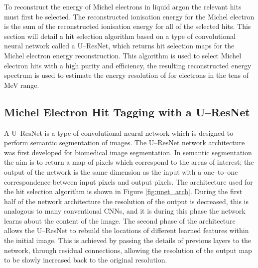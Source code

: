 To reconstruct the energy of Michel electrons in liquid argon the relevant hits
must first be selected. The reconstructed ionisation energy for the Michel
electron is the sum of the reconstructed ionisation energy for all of the
selected hits. This section will detail a hit selection algorithm based on a 
type of convolutional neural network called a U--ResNet, which returns hit 
selection maps for the Michel electron energy reconstruction. This algorithm 
is used to select Michel electron hits with a high purity and efficiency, the 
resulting reconstructed energy spectrum is used to estimate the energy 
resolution of \protodune{} for electrons in the tens of MeV range.

\subsection{Michel Electron Hit Tagging with a U--ResNet}

A U--ResNet is a type of convolutional neural network which is designed to 
perform semantic segmentation of images. The U--ResNet network architecture 
was first developed for biomedical image segmentation\cite{ronneberger2015u}. 
In semantic segmentation the aim is to return a map of pixels which correspond 
to the areas of interest; the output of the network is the same dimension as 
the input with a one--to--one correspondence between input pixels and output 
pixels. The architecture used for the hit selection algorithm is shown in 
Figure \ref{fig:unet_arch}. During the first half of the network architecture 
the resolution of the output is decreased, this is analogous to many 
conventional CNNs, and it is during this phase the network learns about the 
content of the image. The second phase of the architecture allows the 
U--ResNet to rebuild the locations of different learned features within the 
initial image. This is achieved by passing the details of previous layers to 
the network, through residual connections, allowing the resolution of the 
output map to be slowly increased back to the original resolution.


